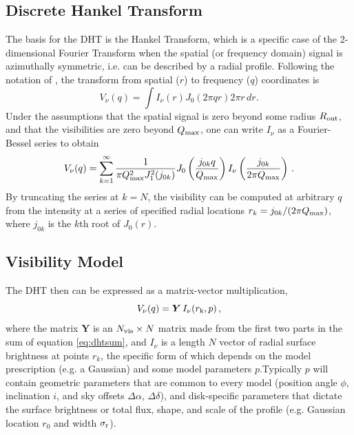 \documentclass[fleqn,usenatbib]{rasti}
\begin{document}
\subsection{Discrete Hankel Transform}

The basis for the DHT is the Hankel Transform, which is a specific case of the 2-dimensional Fourier Transform when the spatial (or frequency domain) signal is azimuthally symmetric, i.e. can be described by a radial profile. Following the notation of \citet{2020MNRAS.tmp.1491J}, the transform from spatial ($r$) to frequency ($q$) coordinates is
\begin{equation}\label{eq:hankel}
    V_\nu(q) = \int I_\nu(r) J_0(2\pi q r) 2 \pi r \, dr.
\end{equation}
Under the assumptions that the spatial signal is zero beyond some radius $R_{\rm out}$, and that the visibilities are zero beyond $Q_{\rm max}$, one can write $I_\nu$ as a Fourier-Bessel series to obtain
\begin{equation}\label{eq:dhtsum}
    V_\nu(q) = \sum_{k=1}^\infty \frac{1}{\pi Q_{\rm max}^2 J_1^2(j_{0k})} J_0 \left( \frac{j_{0k} q}{Q_{\rm max}} \right) I_\nu \left( \frac{j_{0k}}{2 \pi Q_{\rm max}} \right) \, .
\end{equation}
By truncating the series at $k=N$, the visibility can be computed at arbitrary $q$ from the intensity at a series of specified radial locations $r_k=j_{0k}/(2\pi Q_{\rm max})$, where $j_{0k}$ is the $k$th root of $J_0(r)$.

\subsection{Visibility Model}

The DHT then can be expressed as a matrix-vector multiplication,
\begin{equation}\label{eq:dht}
    V_\nu(q) = \boldsymbol{Y} \, I_\nu(r_{\rm k}, p) \, ,
\end{equation}
where the matrix $\boldsymbol{Y}$ is an $N_{\rm vis} \times N$ matrix made from the first two parts in the sum of equation \ref{eq:dhtsum}, and $I_\nu$ is a length $N$ vector of radial surface brightness at points $r_k$, the specific form of which depends on the model prescription (e.g. a Gaussian) and some model parameters $p$.Typically $p$ will contain geometric parameters that are common to every model (position angle $\phi$, inclination $i$, and sky offsets $\Delta \alpha$, $\Delta \delta$), and disk-specific parameters that dictate the surface brightness or total flux, shape, and scale of the profile (e.g. Gaussian location $r_0$ and width $\sigma_{\rm r}$). %
\end{document}
